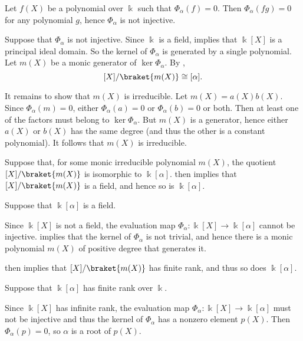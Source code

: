 \begin{defproof}
   Let \( f(X) \) be a polynomial over \( \Bbbk \) such that \( \Phi_\alpha(f) = 0 \). Then \( \Phi_\alpha(fg) = 0 \) for any polynomial \( g \), hence \( \Phi_\alpha \) is not injective.

   Suppose that \( \Phi_\alpha \) is not injective. Since \( \Bbbk \) is a field,  implies that \( \Bbbk[X] \) is a principal ideal domain. So the kernel of \( \Phi_\alpha \) is generated by a single polynomial. Let \( m(X) \) be a monic generator of \( \ker \Phi_\alpha \). By ,
  \begin{equation*}
    \Bbbk[X] / \braket{ m(X) } \cong \Bbbk[\alpha].
  \end{equation*}

  It remains to show that \( m(X) \) is irreducible. Let \( m(X) = a(X) b(X) \). Since \( \Phi_\alpha(m) = 0 \), either \( \Phi_\alpha(a) = 0 \) or \( \Phi_\alpha(b) = 0 \) or both. Then at least one of the factors must belong to \( \ker \Phi_\alpha \). But \( m(X) \) is a generator, hence either \( a(X) \) or \( b(X) \) has the same degree (and thus the other is a constant polynomial). It follows that \( m(X) \) is irreducible.

   Suppose that, for some monic irreducible polynomial \( m(X) \), the quotient \( \Bbbk[X] / \braket{ m(X) } \) is isomorphic to \( \Bbbk[\alpha] \).  then implies that \( \Bbbk[X] / \braket{ m(X) } \) is a field, and hence so is \( \Bbbk[\alpha] \).

   Suppose that \( \Bbbk[\alpha] \) is a field.

  Since \( \Bbbk[X] \) is not a field, the evaluation map \( \Phi_\alpha: \Bbbk[X] \to \Bbbk[\alpha] \) cannot be injective.  implies that the kernel of \( \Phi_\alpha \) is not trivial, and hence there is a monic polynomial \( m(X) \) of positive degree that generates it.

   then implies that \( \Bbbk[X] / \braket{ m(X) } \) has finite rank, and thus so does \( \Bbbk[\alpha] \).

   Suppose that \( \Bbbk[\alpha] \) has finite rank over \( \Bbbk \).

  Since \( \Bbbk[X] \) has infinite rank, the evaluation map \( \Phi_\alpha: \Bbbk[X] \to \Bbbk[\alpha] \) must not be injective and thus the kernel of \( \Phi_\alpha \) has a nonzero element \( p(X) \). Then \( \Phi_\alpha(p) = 0 \), so \( \alpha \) is a root of \( p(X) \).
\end{defproof}


